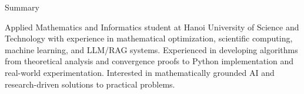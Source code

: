 \documentclass[
a4paper,
12pt,
]{resume}
\begin{document}
    
    
    \begin{rSection}{Summary}

        Applied Mathematics and Informatics student at Hanoi University of Science and
        Technology with experience in mathematical optimization, scientific computing,
        machine learning, and LLM/RAG systems. Experienced in developing algorithms
        from theoretical analysis and convergence proofs to Python implementation and
        real-world experimentation. Interested in mathematically grounded AI and
        research-driven solutions to practical problems.

    \end{rSection}
    
    
\end{document}
